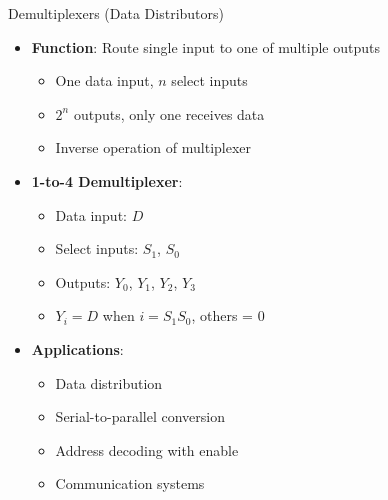 \documentclass[aspectratio=169,11pt]{beamer}
\newcommand{\concept}[1]{\textbf{\color{accentcolor}#1}}
\begin{document}
\begin{frame}{Demultiplexers (Data Distributors)}
\begin{itemize}
\item \concept{Function}: Route single input to one of multiple outputs
\begin{itemize}
\item One data input, $n$ select inputs
\item $2^n$ outputs, only one receives data
\item Inverse operation of multiplexer
\end{itemize}
\vspace{0.5cm}
\item \concept{1-to-4 Demultiplexer}:
\begin{itemize}
\item Data input: $D$
\item Select inputs: $S_1$, $S_0$
\item Outputs: $Y_0$, $Y_1$, $Y_2$, $Y_3$
\item $Y_i = D$ when $i = S_1S_0$, others = 0
\end{itemize}
\vspace{0.3cm}
\item \concept{Applications}:
\begin{itemize}
\item Data distribution
\item Serial-to-parallel conversion
\item Address decoding with enable
\item Communication systems
\end{itemize}
\end{itemize}
\end{frame}
\end{document}
